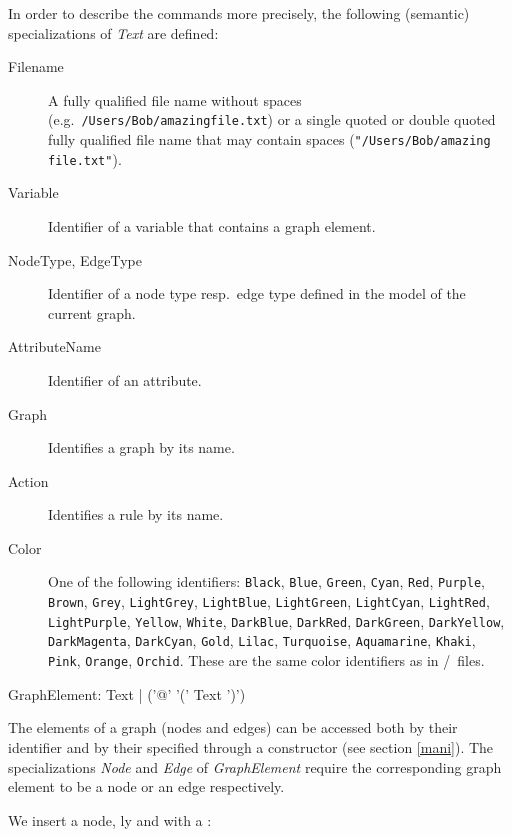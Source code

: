 In order to describe the commands more precisely, the following (semantic) specializations of \emph{Text} are defined:
\begin{description}
  \item[Filename]A fully qualified file name without spaces (e.g.\ \texttt{/Users/Bob/amazing\textunderscore file.txt}) or a single quoted or double quoted fully qualified file name that may contain spaces (\texttt{"/Users/Bob/amazing file.txt"}).
  \item[Variable] Identifier of a variable that contains a graph element. 
  \item[NodeType, EdgeType] Identifier of a node type resp.\ edge type defined in the model of the current graph.
  \item[AttributeName] Identifier of an attribute.
  \item[Graph] Identifies a graph by its name.
  \item[Action] Identifies a rule by its name.
  \item[Color] One of the following  identifiers: \texttt{Black}, \texttt{Blue}, \texttt{Green}, \texttt{Cyan}, \texttt{Red}, \texttt{Purple}, \texttt{Brown}, \texttt{Grey}, \texttt{LightGrey}, \texttt{LightBlue}, \texttt{LightGreen}, \texttt{LightCyan}, \texttt{LightRed}, \texttt{LightPurple}, \texttt{Yel\-low}, \texttt{White}, \texttt{DarkBlue}, \texttt{DarkRed}, \texttt{DarkGreen}, \texttt{DarkYellow}, \texttt{DarkMagenta}, \texttt{DarkCyan}, \texttt{Gold}, \texttt{Lilac}, \texttt{Turquoise}, \texttt{Aquamarine}, \texttt{Khaki}, \texttt{Pink}, \texttt{Orange}, \texttt{Orchid}. These are the same color identifiers as in /\yComp\ files.
\end{description}
\makeatletter
\begin{rail}
  GraphElement: Text | ('@' '(' Text ')')
\end{rail}%
\makeatother
The elements of a graph (nodes and edges) can be accessed both by their  identifier and by their  specified through a constructor (see section \ref{mani}).
The specializations \emph{Node} and \emph{Edge} of \emph{GraphElement} require the corresponding graph element to be a node or an edge respectively.
\begin{example}
\label{persistentex} 
We insert a node, ly and with a :
\end{example}
